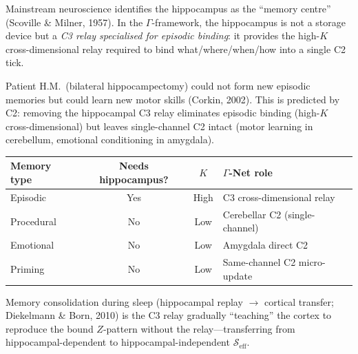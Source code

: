 \documentclass[aps,pre,twocolumn,superscriptaddress,floatfix]{revtex4-2}
\begin{document}
\begin{remark}
\label{rem:hippocampus}
Mainstream neuroscience identifies the hippocampus as
the ``memory centre'' (Scoville \& Milner, 1957).
In the $\Gamma$-framework, the hippocampus is not a
storage device but a \emph{C3 relay specialised for
episodic binding}: it provides the high-$K$
cross-dimensional relay required to bind
what/where/when/how into a single C2 tick.

Patient H.M.\ (bilateral hippocampectomy) could not
form new episodic memories but could learn new
motor skills (Corkin, 2002).
This is predicted by C2: removing the hippocampal
C3 relay eliminates episodic binding (high-$K$
cross-dimensional) but leaves single-channel C2
intact (motor learning in cerebellum, emotional
conditioning in amygdala).

\begin{center}
\begin{tabular}{lccl}
\toprule
Memory type & Needs hippocampus? & $K$ & $\Gamma$-Net role \\
\midrule
Episodic & Yes & High &
  C3 cross-dimensional relay \\
Procedural & No & Low &
  Cerebellar C2 (single-channel) \\
Emotional & No & Low &
  Amygdala direct C2 \\
Priming & No & Low &
  Same-channel C2 micro-update \\
\bottomrule
\end{tabular}
\end{center}

Memory consolidation during sleep
(hippocampal replay $\to$ cortical transfer;
Diekelmann \& Born, 2010) is the C3 relay
gradually ``teaching'' the cortex to reproduce the
bound $Z$-pattern without the relay---transferring
from hippocampal-dependent to hippocampal-independent
$\mathcal{S}_{\text{eff}}$.
\end{remark}
\end{document}
